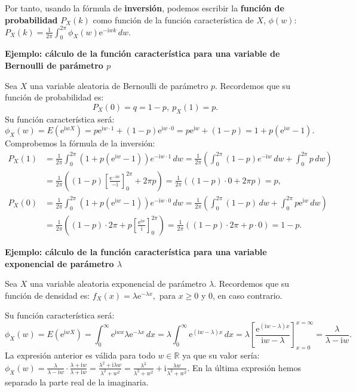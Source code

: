 \documentclass[]{book}
\begin{document}
Por tanto, usando la fórmula de \textbf{inversión}, podemos escribir la \textbf{función de probabilidad} \(P_X(k)\) como función de la función característica de \(X\), \(\phi(w)\):
\(P_X(k)=\frac{1}{2\pi}\int_{0}^{2\pi} \phi_X(w)\mathrm{e}^{-\mathrm{i}w k}\, dw.\)

\textbf{Ejemplo: cálculo de la función característica para una variable de Bernoulli de parámetro \(p\)}

Sea \(X\) una variable aleatoria de Bernoulli de parámetro \(p\). Recordemos que su función de probabilidad es:
\[
P_X(0)=q=1-p,\ p_X(1)=p.
\]
Su función característica será:
\[
\phi_X (w)=E\left(\mathrm{e}^{\mathrm{i}wX}\right) =p\mathrm{e}^{\mathrm{i}w\cdot 1}+(1-p)\mathrm{e}^{\mathrm{i}w\cdot 0}=p\mathrm{e}^{\mathrm{i}w}+(1-p)=1+p\left(\mathrm{e}^{\mathrm{i}w} -1 \right).
\]
Comprobemos la fórmula de la inversión:
\[
\begin{array}{rl}
P_X(1) & = \frac{1}{2\pi}\int_0^{2\pi} \left(1+p\left(\mathrm{e}^{\mathrm{i}w} -1 \right)\right) e^{-\mathrm{i}w\cdot 1}\, dw =\frac{1}{2\pi}\left(\int_0^{2\pi} (1-p)e^{-\mathrm{i}w}\, dw + \int_0^{2\pi} p\, dw\right) \\ & = \frac{1}{2\pi}\left( (1-p) \left[\frac{\mathrm{e}^{-\mathrm{i}w}}{-\mathrm{i}}\right]_0^{2\pi} +2\pi p\right)=\frac{1}{2\pi}\left((1-p)\cdot 0 +2\pi p\right)=p, \\
P_X(0) & = \frac{1}{2\pi}\int_0^{2\pi} \left(1+p\left(\mathrm{e}^{\mathrm{i}w} -1 \right)\right) e^{-\mathrm{i}w\cdot 0}\, dw =\frac{1}{2\pi}\left(\int_0^{2\pi} (1-p) \, dw + \int_0^{2\pi} p \mathrm{e}^{\mathrm{i}w}\, dw\right) \\ & = \frac{1}{2\pi}\left( (1-p) \cdot 2\pi  +p \left[\frac{\mathrm{e}^{\mathrm{i}w}}{\mathrm{i}}\right]_0^{2\pi}\right)=\frac{1}{2\pi}\left((1-p)\cdot 2\pi + p\cdot 0\right)=1-p.
\end{array}
\]

\textbf{Ejemplo: cálculo de la función característica para una variable exponencial de parámetro \(\lambda\)}

Sea \(X\) una variable aleatoria exponencial de parámetro \(\lambda\). Recordemos que su función de densidad es: \(f_X(x)=\lambda \mathrm{e}^{-\lambda x},\) para \(x\geq 0\) y \(0\), en caso contrario.

Su función característica será:
\[
\phi_X (w)=E\left(\mathrm{e}^{\mathrm{i}wX}\right)=\int_0^\infty \mathrm{e}^{\mathrm{i}w x}\lambda \mathrm{e}^{-\lambda x}\, dx = \lambda \int_0^\infty\mathrm{e}^{(\mathrm{i}w-\lambda)x}\, dx = \lambda\left[\frac{\mathrm{e}^{(\mathrm{i}w-\lambda)x}}{\mathrm{i}w-\lambda}\right]_{x=0}^{x=\infty} = \frac{\lambda}{\lambda -\mathrm{i} w}. 
\]
La expresión anterior es válida para todo \(w\in\mathbb{R}\) ya que su valor sería:
\(\phi_X (w)=\frac{\lambda}{\lambda -\mathrm{i} w}\cdot \frac{\lambda +\mathrm{i} w}{\lambda +\mathrm{i} w}=\frac{\lambda^2+\mathrm{i}\lambda w}{\lambda^2+w^2}=\frac{\lambda^2}{\lambda^2+w^2}+\mathrm{i}\frac{\lambda w}{\lambda^2+w^2}.\)
En la última expresión hemos separado la parte real de la imaginaria.
\end{document}
